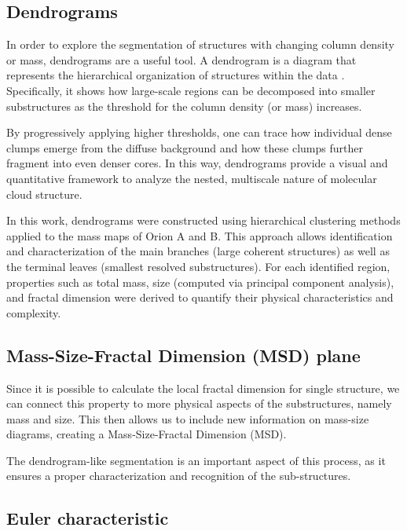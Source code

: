 \subsection{Dendrograms}

In order to explore the segmentation of structures with changing column density or mass, dendrograms are a useful tool. A dendrogram is a diagram that represents the hierarchical organization of structures within the data \cite{everitt2010cambridge}. Specifically, it shows how large-scale regions can be decomposed into smaller substructures as the threshold for the column density (or mass) increases.

By progressively applying higher thresholds, one can trace how individual dense clumps emerge from the diffuse background and how these clumps further fragment into even denser cores. In this way, dendrograms provide a visual and quantitative framework to analyze the nested, multiscale nature of molecular cloud structure.

In this work, dendrograms were constructed using hierarchical clustering methods applied to the mass maps of Orion A and B. This approach allows identification and characterization of the main branches (large coherent structures) as well as the terminal leaves (smallest resolved substructures). For each identified region, properties such as total mass, size (computed via principal component analysis), and fractal dimension were derived to quantify their physical characteristics and complexity.

\subsection{Mass-Size-Fractal Dimension (MSD) plane}

Since it is possible to calculate the local fractal dimension for single structure, we can connect this property to more physical aspects of the substructures, namely mass and size. This then allows us to include new information on mass-size diagrams, creating a Mass-Size-Fractal Dimension (MSD).

The dendrogram-like segmentation is an important aspect of this process, as it ensures a proper characterization and recognition of the sub-structures. 

\subsection{Euler characteristic}

